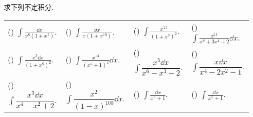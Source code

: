\begin{example}
    求下列不定积分.
    \setcounter{magicrownumbers}{0}
    \begin{table}[H]
        \centering
        \begin{tabular}{l | l | l | l}
            (\rownumber{}) $\displaystyle\int\frac{\dd x}{x^8\left(1+x^2\right)}.$   & (\rownumber{}) $\displaystyle\int\frac{\dd x}{x\left(1+x^{10}\right)}.$     & (\rownumber{}) $\displaystyle\int\frac{x^{11}}{\left(1+x^8\right)^2}.$ & (\rownumber{}) $\displaystyle\int\frac{x^{11}}{x^8+3x^4+2}\dd x.$ \\
            (\rownumber{}) $\displaystyle\int\frac{x^3\dd x}{\left(1+x^8\right)^2}.$ & (\rownumber{}) $\displaystyle\int\frac{x^{14}}{\left(x^5+1\right)^4}\dd x.$ & (\rownumber{}) $\displaystyle\int\dfrac{x^5\dd x}{x^6-x^3-2}.$         & (\rownumber{}) $\displaystyle\int\dfrac{x\dd x}{x^4-2x^2-1}.$     \\
            (\rownumber{}) $\displaystyle\int\dfrac{x^3\dd x}{x^4-x^2+2}.$           & (\rownumber{}) $\displaystyle\int\dfrac{x^2}{(1-x)^{100}}\dd x.$            & (\rownumber{}) $\displaystyle\int\frac{\dd x}{x^4+1}.$                 & (\rownumber{}) $\displaystyle\int\frac{\dd x}{x^6+1}.$
        \end{tabular}
    \end{table}
\end{example}
